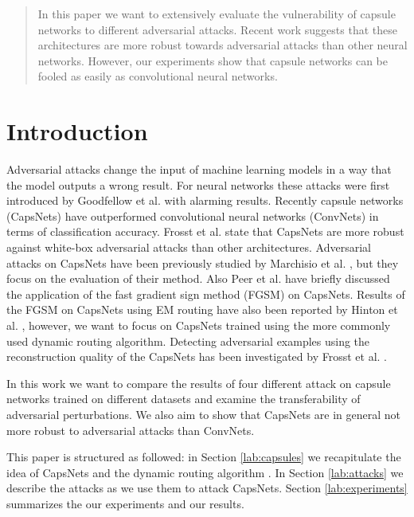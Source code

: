 \documentclass{article}
\begin{document}
\printAffiliationsAndNotice{\icmlEqualContribution} %

\begin{abstract}
	In this paper we want to extensively evaluate the vulnerability of capsule networks to different adversarial attacks. Recent work suggests that these architectures are more robust towards adversarial attacks than other neural networks. However, our experiments show that capsule networks can be fooled as easily as convolutional neural networks.
\end{abstract}

\section{Introduction}
Adversarial attacks change the input of machine learning models in a way that the model outputs a wrong result. For neural networks these attacks were first introduced by Goodfellow et al.  with alarming results. Recently capsule networks (CapsNets) \cite{capsules} have outperformed convolutional neural networks (ConvNets) in terms of classification accuracy. Frosst et al.  state that CapsNets are more robust against white-box adversarial attacks than other architectures. Adversarial attacks on CapsNets have been previously studied by Marchisio et al. , but they focus on the evaluation of their method. Also Peer et al.  have briefly discussed the application of the fast gradient sign method (FGSM) \cite{fgsm} on CapsNets. Results of the FGSM on CapsNets using EM routing have also been reported by Hinton et al. , however, we want to focus on CapsNets trained using the more commonly used dynamic routing algorithm. Detecting adversarial examples using the reconstruction quality of the CapsNets has been investigated by Frosst et al. . 

In this work we want to compare the results of four different attack on capsule networks trained on different datasets and examine the transferability of adversarial perturbations. We also aim to show that CapsNets are in general not more robust to adversarial attacks than ConvNets.

This paper is structured as followed: in Section \ref{lab:capsules} we recapitulate the idea of CapsNets and the dynamic routing algorithm \cite{capsules}. In Section \ref{lab:attacks} we describe the attacks as we use them to attack CapsNets. Section \ref{lab:experiments} summarizes the our experiments and our results.
\end{document}
